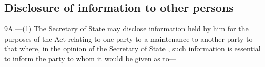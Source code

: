 \documentclass[a4paper,12pt]{article}
\begin{document}
\subsection[9A. Disclosure of information to other persons]{Disclosure of information to other persons}

9A.—(1) The Secretary of State 
may disclose information 
held by him for the purposes of the Act relating to  %
one party to a maintenance  to another party to that  where, in the opinion of the Secretary of State%
, such information is essential to inform the party to whom it would be given as to—
\end{document}
